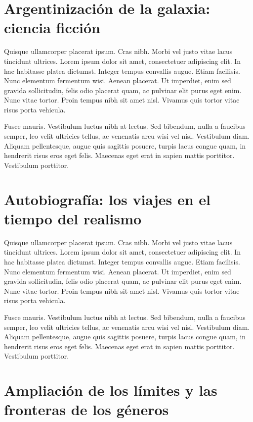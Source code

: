 \section{Argentinización de la galaxia: ciencia ficción}

Quisque ullamcorper placerat ipsum. Cras nibh. Morbi vel justo vitae lacus tincidunt ultrices. Lorem ipsum dolor sit amet, consectetuer adipiscing elit. In hac habitasse platea dictumst. Integer tempus convallis augue. Etiam facilisis. Nunc elementum fermentum wisi. Aenean placerat. Ut imperdiet, enim sed gravida sollicitudin, felis odio placerat quam, ac pulvinar elit purus eget enim. Nunc vitae tortor. Proin tempus nibh sit amet nisl. Vivamus quis tortor vitae risus porta vehicula.

Fusce mauris. Vestibulum luctus nibh at lectus. Sed bibendum, nulla a faucibus semper, leo velit ultricies tellus, ac venenatis arcu wisi vel nisl. Vestibulum diam. Aliquam pellentesque, augue quis sagittis posuere, turpis lacus congue quam, in hendrerit risus eros eget felis. Maecenas eget erat in sapien mattis porttitor. Vestibulum porttitor.

\section{Autobiografía: los viajes en el tiempo del realismo}

Quisque ullamcorper placerat ipsum. Cras nibh. Morbi vel justo vitae lacus tincidunt ultrices. Lorem ipsum dolor sit amet, consectetuer adipiscing elit. In hac habitasse platea dictumst. Integer tempus convallis augue. Etiam facilisis. Nunc elementum fermentum wisi. Aenean placerat. Ut imperdiet, enim sed gravida sollicitudin, felis odio placerat quam, ac pulvinar elit purus eget enim. Nunc vitae tortor. Proin tempus nibh sit amet nisl. Vivamus quis tortor vitae risus porta vehicula.

Fusce mauris. Vestibulum luctus nibh at lectus. Sed bibendum, nulla a faucibus semper, leo velit ultricies tellus, ac venenatis arcu wisi vel nisl. Vestibulum diam. Aliquam pellentesque, augue quis sagittis posuere, turpis lacus congue quam, in hendrerit risus eros eget felis. Maecenas eget erat in sapien mattis porttitor. Vestibulum porttitor.

\section{Ampliación de los límites y las fronteras de los géneros}

